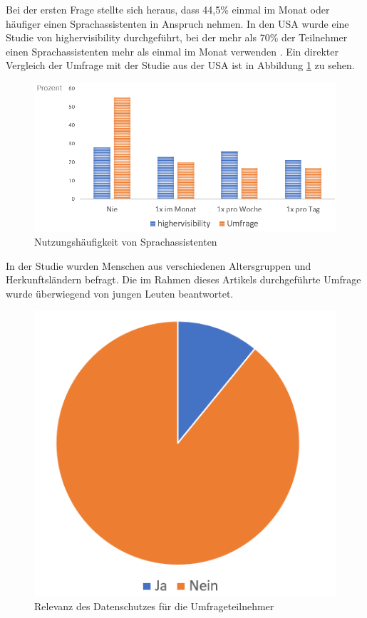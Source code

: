 Bei der ersten Frage stellte sich heraus, dass 44,5\% einmal im Monat oder häufiger einen Sprachassistenten in Anspruch nehmen. In den USA wurde eine Studie von \glqq highervisibility\grqq{} durchgeführt, bei der mehr als 70\% der Teilnehmer einen Sprachassistenten mehr als einmal im Monat verwenden \cite{highervisibility}.
Ein direkter Vergleich der Umfrage mit der Studie aus der USA ist in Abbildung \ref{fig:umfrage_haeufigkeit} zu sehen.

\begin{figure}[!h]
	\centering
	\includegraphics[width=0.9\linewidth]{Picture/umfrage_haeufigkeit}
	\caption[Nutzungshäufigkeit von Sprachassistenten]{Nutzungshäufigkeit von Sprachassistenten}
	\label{fig:umfrage_haeufigkeit}
\end{figure}

In der Studie wurden Menschen aus verschiedenen Altersgruppen und Herkunftsländern befragt. Die im Rahmen dieses Artikels durchgeführte Umfrage wurde überwiegend von jungen Leuten beantwortet.

\begin{figure}[!h]
 	\centering
 	\includegraphics[width=0.5\linewidth]{Picture/umfrage_datenschutz}
 	\caption[Relevanz des Datenschutzes für die Umfrageteilnehmer]{Relevanz des Datenschutzes für die Umfrageteilnehmer}
 	\label{fig:umfrage_datenschutz}
\end{figure}

